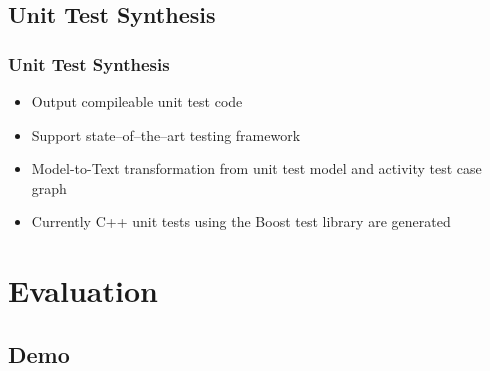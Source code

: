 \documentclass{beamer}
\begin{document}
\subsection{Unit Test Synthesis}
\begin{frame}
\frametitle{Unit Test Synthesis}
\begin{itemize} 
\item Output compileable unit test code
\item Support state--of--the--art testing framework
\item Model-to-Text transformation from unit test model and activity test case graph
\item Currently C++ unit tests using the Boost test library are generated
\end{itemize}
\end{frame}

\section{Evaluation}
\subsection{Demo}
\end{document}
